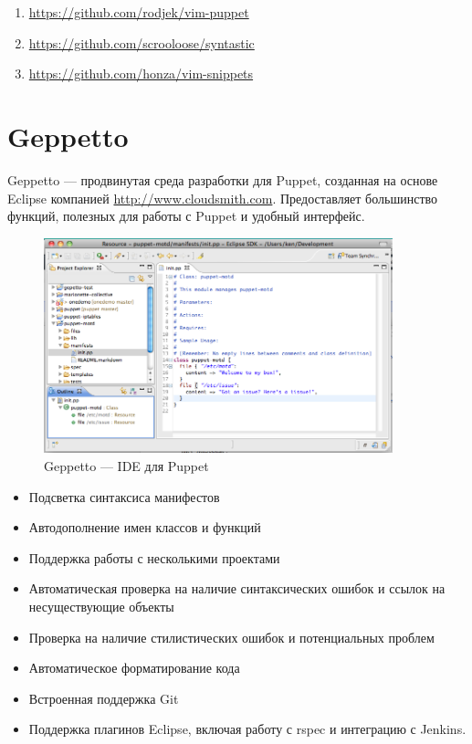 \begin{enumerate}
\item \url{https://github.com/rodjek/vim-puppet}
\item \url{https://github.com/scrooloose/syntastic}
\item \url{https://github.com/honza/vim-snippets}
\end{enumerate}

\section{Geppetto}

Geppetto --- продвинутая среда разработки для Puppet, созданная на основе Eclipse компанией \url{http://www.cloudsmith.com}. Предоставляет большинство функций, полезных для работы с Puppet и удобный интерфейс.

\begin{figure}[!ht]
\centering
\includegraphics[width=0.9\textwidth]{img/geppetto.png}
\caption{Geppetto --- IDE для Puppet}
\label{fig:geppetto}
\end{figure}

\begin{itemize}
\item Подсветка синтаксиса манифестов
\item Автодополнение имен классов и функций
\item Поддержка работы с несколькими проектами
\item Автоматическая проверка на наличие синтаксических ошибок и ссылок на несуществующие объекты
\item Проверка на наличие стилистических ошибок и потенциальных проблем
\item Автоматическое форматирование кода
\item Встроенная поддержка Git
\item Поддержка плагинов Eclipse, включая работу с rspec и интеграцию с Jenkins.
\end{itemize}

